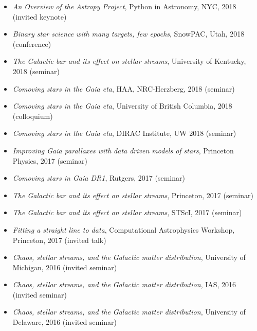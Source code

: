 \documentclass[12pt,letterpaper]{article}
\begin{document}
\begin{itemize}
    \item \emph{An Overview of the Astropy Project}, Python in Astronomy, NYC, 2018 (invited keynote)
    \item \emph{Binary star science with many targets, few epochs}, SnowPAC, Utah, 2018 (conference)
    \item \emph{The Galactic bar and its effect on stellar streams}, University of Kentucky, 2018 (seminar)
    \item \emph{Comoving stars in the Gaia eta}, HAA, NRC-Herzberg, 2018 (seminar)
    \item \emph{Comoving stars in the Gaia eta}, University of British Columbia, 2018 (colloquium)
    \item \emph{Comoving stars in the Gaia eta}, DIRAC Institute, UW 2018 (seminar)
    \item \emph{Improving Gaia parallaxes with data driven models of stars}, Princeton Physics, 2017 (seminar)
    \item \emph{Comoving stars in Gaia DR1}, Rutgers, 2017 (seminar)
    \item \emph{The Galactic bar and its effect on stellar streams}, Princeton, 2017 (seminar)
    \item \emph{The Galactic bar and its effect on stellar streams}, STScI, 2017 (seminar)
    \item \emph{Fitting a straight line to data}, Computational Astrophysics Workshop, Princeton, 2017 (invited talk)
    \item \emph{Chaos, stellar streams, and the Galactic matter distribution}, University of Michigan, 2016 (invited seminar)
    \item \emph{Chaos, stellar streams, and the Galactic matter distribution}, IAS, 2016 (invited seminar)
    \item \emph{Chaos, stellar streams, and the Galactic matter distribution}, University of Delaware, 2016 (invited seminar)

\end{itemize}
\end{document}
